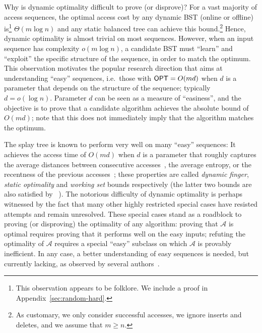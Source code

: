 Why is dynamic optimality difficult to prove (or disprove)? For a vast majority of access sequences, the optimal access cost by any dynamic BST (online or offline) is\footnote{This observation appears to be folklore. We include a proof in Appendix~\ref{sec:random-hard}.} $\Theta(m \log n)$ 
and any static balanced tree can achieve this bound.\footnote{As customary, we only consider successful accesses, we ignore inserts and deletes, and we assume that $m \geq n$. }
Hence, dynamic optimality is almost trivial on most sequences. However, when an input sequence has complexity $o(m \log n)$, a candidate BST must ``learn'' and ``exploit'' the specific structure of the sequence, in order to match the optimum. This observation motivates the popular research direction that aims at understanding ``easy'' sequences, i.e.\ those with $\mbox{\sf OPT} = O(m d)$ when $d$ is a parameter that depends on the structure of the sequence; typically $d=o(\log n)$. 
Parameter $d$ can be seen as a measure of ``easiness'', and the objective is to prove that a candidate algorithm achieves the absolute bound of $O(m d)$; note that this does not immediately imply that the algorithm matches the optimum.

The splay tree is known to perform very well on many ``easy'' sequences: It achieves the access time of $O(m d)$ when $d$ is a parameter that roughly captures the average distances between consecutive accesses~\cite{finger1,finger2}, the average entropy, or the recentness of the previous accesses~\cite{ST85}; these properties are called {\em dynamic finger}, {\em static optimality} and {\em working set} bounds respectively (the latter two bounds are also satisfied by \greedy~\cite{Fox11}). %
The notorious difficulty of dynamic optimality is perhaps witnessed by the fact that many other highly restricted special cases have resisted attempts and remain unresolved. These special cases stand as a roadblock to proving (or disproving) the optimality of any algorithm: proving that $\mathcal{A}$ is optimal requires proving that it performs well on the easy inputs; refuting the optimality of $\mathcal{A}$ requires a special ``easy'' subclass %
on which $\mathcal{A}$ is provably inefficient. In any case, a better understanding of easy sequences is needed, but currently lacking, as observed by several authors~\cite{DHIKP09,deque_Pet08}.%
  
